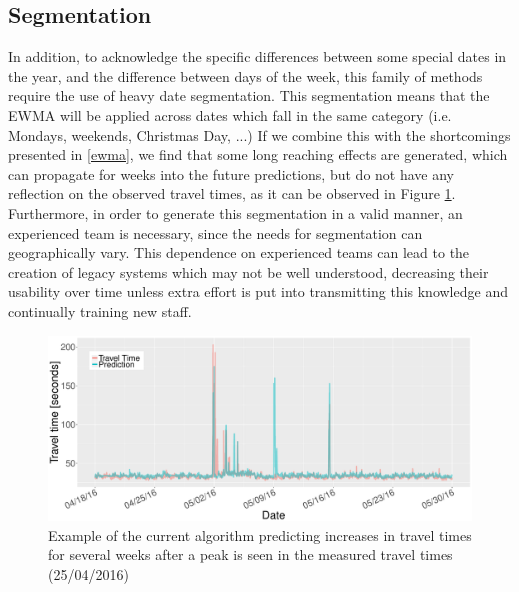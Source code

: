 \documentclass[conference]{IEEEtran}
\begin{document}
\subsection{Segmentation}\label{segmentation}
In addition, to acknowledge the specific differences between some special dates in the year, and the difference between days of the week, this family of methods require the use of heavy date segmentation. 
This segmentation means that the EWMA will be applied across dates which fall in the same category (i.e. Mondays, weekends, Christmas Day, ...)
If we combine this with the shortcomings presented in \ref{ewma}, we find that some long reaching effects are generated, which can propagate for weeks into the future predictions, but do not have any reflection on the observed travel times, as it can be observed in Figure \ref{fig:EWMA_spike}. 
Furthermore, in order to generate this segmentation in a valid manner, an experienced team is necessary, since the needs for segmentation can geographically vary. 
This dependence on experienced teams can lead to the creation of legacy systems which may not be well understood, decreasing their usability over time unless extra effort is put into transmitting this knowledge and continually training new staff.
\begin{figure}
	\includegraphics[width=\linewidth]{EWMA.pdf}
	\caption{Example of the current algorithm predicting increases in travel times for several weeks after a peak is seen in the measured travel times (25/04/2016)}
	\label{fig:EWMA_spike}
\end{figure}
\end{document}
